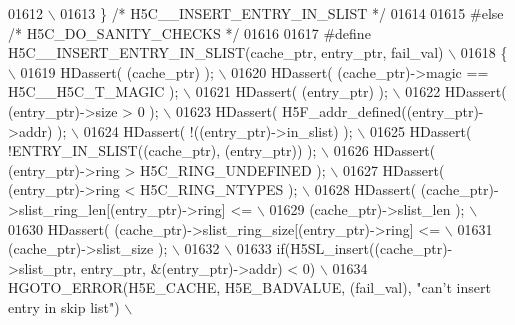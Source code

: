 \begin{DoxyCode}
01612 \textcolor{preprocessor}{                                                                               \(\backslash\)}
01613 \textcolor{preprocessor}{\} }\textcolor{comment}{/* H5C\_\_INSERT\_ENTRY\_IN\_SLIST */}\textcolor{preprocessor}{}
01614 
01615 \textcolor{preprocessor}{#else }\textcolor{comment}{/* H5C\_DO\_SANITY\_CHECKS */}\textcolor{preprocessor}{}
01616 
01617 \textcolor{preprocessor}{#define H5C\_\_INSERT\_ENTRY\_IN\_SLIST(cache\_ptr, entry\_ptr, fail\_val)             \(\backslash\)}
01618 \textcolor{preprocessor}{\{                                                                              \(\backslash\)}
01619 \textcolor{preprocessor}{    HDassert( (cache\_ptr) );                                                   \(\backslash\)}
01620 \textcolor{preprocessor}{    HDassert( (cache\_ptr)->magic == H5C\_\_H5C\_T\_MAGIC );                        \(\backslash\)}
01621 \textcolor{preprocessor}{    HDassert( (entry\_ptr) );                                                   \(\backslash\)}
01622 \textcolor{preprocessor}{    HDassert( (entry\_ptr)->size > 0 );                                         \(\backslash\)}
01623 \textcolor{preprocessor}{    HDassert( H5F\_addr\_defined((entry\_ptr)->addr) );                           \(\backslash\)}
01624 \textcolor{preprocessor}{    HDassert( !((entry\_ptr)->in\_slist) );                                      \(\backslash\)}
01625 \textcolor{preprocessor}{    HDassert( !ENTRY\_IN\_SLIST((cache\_ptr), (entry\_ptr)) );                     \(\backslash\)}
01626 \textcolor{preprocessor}{    HDassert( (entry\_ptr)->ring > H5C\_RING\_UNDEFINED );                        \(\backslash\)}
01627 \textcolor{preprocessor}{    HDassert( (entry\_ptr)->ring < H5C\_RING\_NTYPES );                           \(\backslash\)}
01628 \textcolor{preprocessor}{    HDassert( (cache\_ptr)->slist\_ring\_len[(entry\_ptr)->ring] <=                \(\backslash\)}
01629 \textcolor{preprocessor}{              (cache\_ptr)->slist\_len );                                        \(\backslash\)}
01630 \textcolor{preprocessor}{    HDassert( (cache\_ptr)->slist\_ring\_size[(entry\_ptr)->ring] <=               \(\backslash\)}
01631 \textcolor{preprocessor}{              (cache\_ptr)->slist\_size );                                       \(\backslash\)}
01632 \textcolor{preprocessor}{                                                                               \(\backslash\)}
01633 \textcolor{preprocessor}{    if(H5SL\_insert((cache\_ptr)->slist\_ptr, entry\_ptr, &(entry\_ptr)->addr) < 0) \(\backslash\)}
01634 \textcolor{preprocessor}{        HGOTO\_ERROR(H5E\_CACHE, H5E\_BADVALUE, (fail\_val), "can't insert entry in skip list") \(\backslash\)}

\end{DoxyCode}
